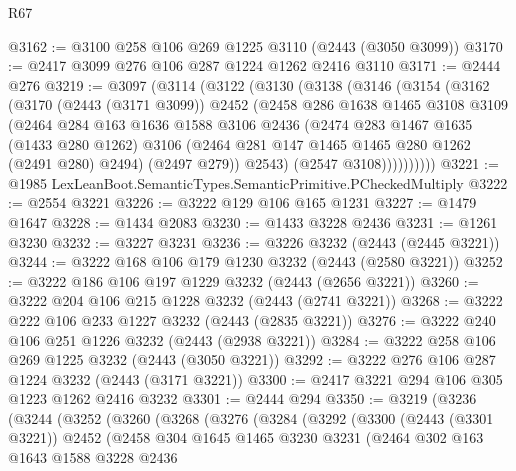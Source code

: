 \begin{lexlean}{R67}
\begin{coremodule}
@3162 := @3100 @258 @106 @269 @1225 @3110 (@2443 (@3050 @3099))
@3170 := @2417 @3099 @276 @106 @287 @1224 @1262 @2416 @3110
@3171 := @2444 @276
@3219 := @3097
    (@3114
      (@3122
        (@3130
          (@3138
            (@3146
              (@3154
                (@3162
                  (@3170
                    (@2443 (@3171 @3099))
                    @2452
                    (@2458
                      @286
                      @1638
                      @1465
                      @3108
                      @3109
                      (@2464
                        @284
                        @163
                        @1636
                        @1588
                        @3106
                        @2436
                        (@2474
                          @283
                          @1467
                          @1635
                          (@1433 @280 @1262)
                          @3106
                          (@2464 @281 @147 @1465 @1465 @280 @1262 (@2491 @280) @2494)
                          (@2497 @279))
                        @2543)
                      (@2547 @3108))))))))))
@3221 := @1985 LexLeanBoot.SemanticTypes.SemanticPrimitive.PCheckedMultiply
@3222 := @2554 @3221
@3226 := @3222 @129 @106 @165 @1231
@3227 := @1479 @1647
@3228 := @1434 @2083
@3230 := @1433 @3228 @2436
@3231 := @1261 @3230
@3232 := @3227 @3231
@3236 := @3226 @3232 (@2443 (@2445 @3221))
@3244 := @3222 @168 @106 @179 @1230 @3232 (@2443 (@2580 @3221))
@3252 := @3222 @186 @106 @197 @1229 @3232 (@2443 (@2656 @3221))
@3260 := @3222 @204 @106 @215 @1228 @3232 (@2443 (@2741 @3221))
@3268 := @3222 @222 @106 @233 @1227 @3232 (@2443 (@2835 @3221))
@3276 := @3222 @240 @106 @251 @1226 @3232 (@2443 (@2938 @3221))
@3284 := @3222 @258 @106 @269 @1225 @3232 (@2443 (@3050 @3221))
@3292 := @3222 @276 @106 @287 @1224 @3232 (@2443 (@3171 @3221))
@3300 := @2417 @3221 @294 @106 @305 @1223 @1262 @2416 @3232
@3301 := @2444 @294
@3350 := @3219
    (@3236
      (@3244
        (@3252
          (@3260
            (@3268
              (@3276
                (@3284
                  (@3292
                    (@3300
                      (@2443 (@3301 @3221))
                      @2452
                      (@2458
                        @304
                        @1645
                        @1465
                        @3230
                        @3231
                        (@2464
                          @302
                          @163
                          @1643
                          @1588
                          @3228
                          @2436

\end{coremodule}
\end{lexlean}
